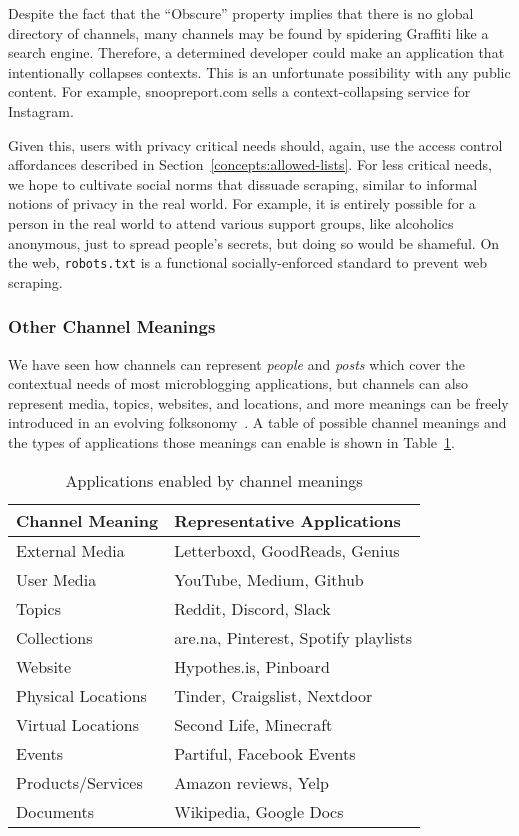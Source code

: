 Despite the fact that the ``Obscure'' property implies that
there is no global directory of channels,
many channels may be found by spidering Graffiti like a search engine.
Therefore, a determined
developer could make an application that intentionally collapses contexts.
This is an unfortunate possibility with any public content.
For example, snoopreport.com sells a context-collapsing service for Instagram.

Given this, users with privacy critical needs should, again, use the
access control affordances described in Section~{\ref{concepts:allowed-lists}}.
For less critical needs,
we hope to cultivate social norms that dissuade scraping, similar to informal notions of privacy in the real world.
For example, it is entirely possible for a person in the real world
to attend various support groups, like alcoholics anonymous,
just to spread people's secrets, but doing so would be shameful.
On the web, \texttt{robots.txt} is a functional socially-enforced standard
to prevent web scraping.


\subsubsection{Other Channel Meanings}

We have seen how channels can represent \emph{people} and \emph{posts}
which cover the contextual needs of most microblogging applications,
but channels can also represent media, topics, websites, and locations,
and more meanings can be freely introduced in an evolving folksonomy~\cite{folksonomy}.
A table of possible channel meanings and the types of applications
those meanings can enable is shown in Table~\ref{concepts:channels-and-applications}.

\begin{table}[h]
\small
\caption{Applications enabled by channel meanings}
\label{concepts:channels-and-applications}
\centering
\begin{tabular}{|l|l|}
\hline
\textbf{Channel Meaning} & \textbf{Representative Applications} \\ \hline
External Media & Letterboxd, GoodReads, Genius \\ \hline
User Media & YouTube, Medium, Github \\ \hline
Topics & Reddit, Discord, Slack \\ \hline
Collections & are.na, Pinterest, Spotify playlists \\ \hline
Website & Hypothes.is, Pinboard \\ \hline
Physical Locations & Tinder, Craigslist, Nextdoor \\ \hline
Virtual Locations & Second Life, Minecraft \\ \hline
Events & Partiful, Facebook Events \\ \hline
Products/Services & Amazon reviews, Yelp \\ \hline
Documents & Wikipedia, Google Docs \\ \hline
\end{tabular}
\end{table}

